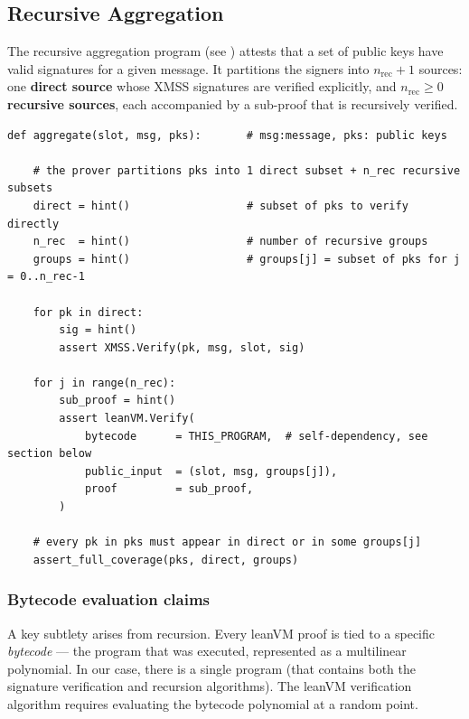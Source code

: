 \documentclass{article}
\theoremstyle{definition}
\begin{document}
\subsection{Recursive Aggregation}\label{sec:recursive-aggregation}

The recursive aggregation program (see ) attests that a set of public keys have valid signatures for a given message. It partitions the signers into $n_{\text{rec}} + 1$ sources: one \textbf{direct source} whose XMSS signatures are verified explicitly, and $n_{\text{rec}} \geq 0$ \textbf{recursive sources}, each accompanied by a sub-proof that is recursively verified.


\begin{framed}
\small
\begin{verbatim}
def aggregate(slot, msg, pks):       # msg:message, pks: public keys

    # the prover partitions pks into 1 direct subset + n_rec recursive subsets
    direct = hint()                  # subset of pks to verify directly
    n_rec  = hint()                  # number of recursive groups
    groups = hint()                  # groups[j] = subset of pks for j = 0..n_rec-1

    for pk in direct:
        sig = hint()
        assert XMSS.Verify(pk, msg, slot, sig)

    for j in range(n_rec):
        sub_proof = hint()
        assert leanVM.Verify(
            bytecode      = THIS_PROGRAM,  # self-dependency, see section below
            public_input  = (slot, msg, groups[j]),
            proof         = sub_proof,
        )

    # every pk in pks must appear in direct or in some groups[j]
    assert_full_coverage(pks, direct, groups)
\end{verbatim}
\end{framed}

\subsubsection{Bytecode evaluation claims}\label{sec:bytecode-reduction}

A key subtlety arises from recursion. Every leanVM proof is tied to a specific \emph{bytecode} --- the program that was executed, represented as a multilinear polynomial. In our case, there is a single program (that contains both the signature verification and recursion algorithms). The leanVM verification algorithm requires evaluating the bytecode polynomial at a random point.
\end{document}
